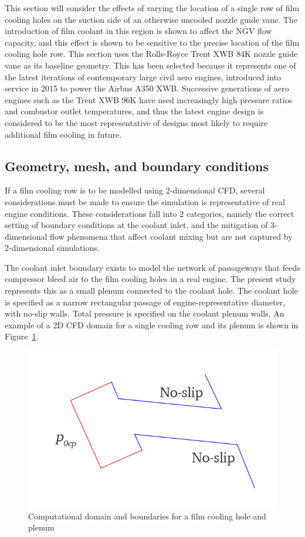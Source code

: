 \documentclass[a4paper, 11pt, oneside]{report}
\begin{document}
This section will consider the effects of varying the location of a single row of film cooling holes on the suction side of an otherwise uncooled nozzle guide vane. The introduction of film coolant in this region is shown to affect the NGV flow capacity, and this effect is shown to be sensitive to the precise location of the film cooling hole row. This section uses the Rolls-Royce Trent XWB 84K nozzle guide vane as its baseline geometry. This has been selected because it represents one of the latest iterations of contemporary large civil aero engines, introduced into service in 2015 to power the Airbus A350 XWB. Successive generations of aero engines such as the Trent XWB 96K have used increasingly high pressure ratios and combustor outlet temperatures, and thus the latest engine design is considered to be the most representative of designs most likely to require additional film cooling in future.

\subsection{Geometry, mesh, and boundary conditions}

If a film cooling row is to be modelled using 2-dimensional CFD, several considerations must be made to ensure the simulation is representative of real engine conditions. These considerations fall into 2 categories, namely the correct setting of boundary conditions at the coolant inlet, and the mitigation of 3-dimensional flow phenomena that affect coolant mixing but are not captured by 2-dimensional simulations. %

The coolant inlet boundary exists to model the network of passageways that feeds compressor bleed air to the film cooling holes in a real engine. The present study represents this as a small plenum connected to the coolant hole. The coolant hole is specified as a narrow rectangular passage of engine-representative diameter, with no-slip walls. Total pressure is specified on the coolant plenum walls. An example of a 2D CFD domain for a single cooling row and its plenum is shown in Figure~\ref{fig:film_cooling_hole_boundary_conditions}.

\begin{figure}[H]
	\centering
	\includegraphics[width=.45\textwidth]{figs/film_cooling_hole_boundary_conditions.png}
	\caption{Computational domain and boundaries for a film cooling hole and plenum}
    \label{fig:film_cooling_hole_boundary_conditions}
\end{figure}
\end{document}
